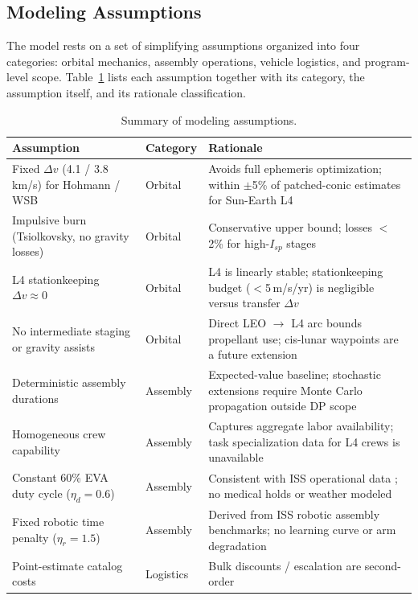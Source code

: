 \subsection{Modeling Assumptions}
\label{sec:assumptions}

The model rests on a set of simplifying assumptions organized into
four categories: orbital mechanics, assembly operations, vehicle
logistics, and program-level scope. Table~\ref{tab:assumptions}
lists each assumption together with its category, the assumption 
itself, and its rationale classification.

\begin{table}[htbp]
\centering
\caption{Summary of modeling assumptions.}
\label{tab:assumptions}
\begin{tabular}{p{4.5cm}lp{5.5cm}}
\toprule
Assumption & Category & Rationale \\
\midrule
Fixed $\Delta v$ (4.1 / 3.8 km/s) for Hohmann / WSB
  & Orbital & Avoids full ephemeris optimization; within
    $\pm$5\% of patched-conic estimates for Sun-Earth L4 \\
Impulsive burn (Tsiolkovsky, no gravity losses)
  & Orbital & Conservative upper bound; losses $<$2\% for
    high-$I_{sp}$ stages \\
L4 stationkeeping $\Delta v \approx 0$
  & Orbital & L4 is linearly stable; stationkeeping budget
    ($<$5\,m/s/yr) is negligible versus transfer $\Delta v$ \\
No intermediate staging or gravity assists
  & Orbital & Direct LEO $\rightarrow$ L4 arc bounds
    propellant use; cis-lunar waypoints are a future extension \\
\midrule
Deterministic assembly durations
  & Assembly & Expected-value baseline; stochastic extensions
    require Monte Carlo propagation outside DP scope \\
Homogeneous crew capability
  & Assembly & Captures aggregate labor availability; task
    specialization data for L4 crews is unavailable \\
Constant 60\% EVA duty cycle ($\eta_d = 0.6$)
  & Assembly & Consistent with ISS operational data
    \cite{mcdonnell_iss_eva}; no medical holds or weather modeled \\
Fixed robotic time penalty ($\eta_r = 1.5$)
  & Assembly & Derived from ISS robotic assembly benchmarks;
    no learning curve or arm degradation \\
\midrule
Point-estimate catalog costs
  & Logistics & Bulk discounts / escalation are second-order

\end{tabular}
\end{table}
